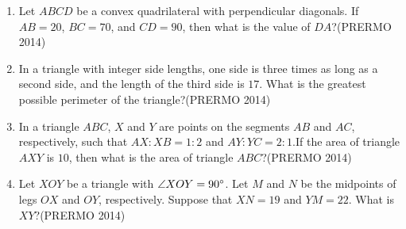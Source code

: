 \begin{enumerate}
    \item Let $ABCD$ be a convex quadrilateral with perpendicular diagonals. If $AB = 20$, $BC = 70$, and $CD = 90$, then what is the value of $DA$?\hfill(PRERMO 2014)
    \item In a triangle with integer side lengths, one side is three times as long as a second side, and the length of the third side is $17$. What is the greatest possible perimeter of the triangle?\hfill(PRERMO 2014)
    \item In a triangle $ABC$, $X$ and $Y$ are points on the segments $AB$ and $AC$, respectively, such that $ AX : XB = 1 : 2 $ and $ AY : YC = 2 : 1.$If the area of triangle $AXY$ is $10$, then what is the area of triangle $ABC$?\hfill(PRERMO 2014)
    \item Let $XOY$ be a triangle with $\angle XOY = 90\degree$. Let $M$ and $N$ be the midpoints of legs $OX$ and $OY$, respectively. Suppose that $XN = 19$ and $YM = 22$. What is $XY$?\hfill(PRERMO 2014)
\end{enumerate}
